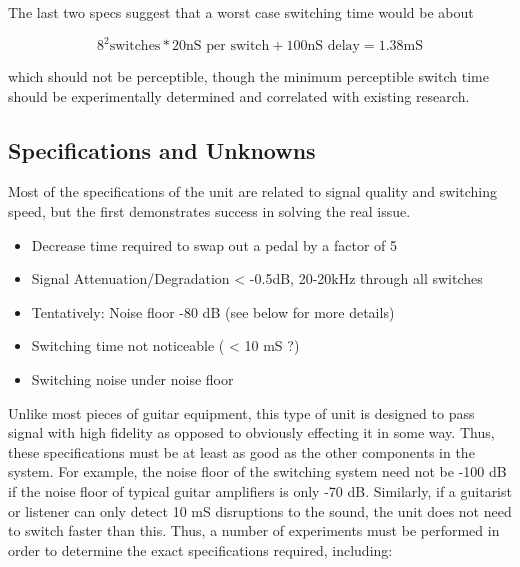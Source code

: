 \documentclass{article}
\begin{document}
The last two specs suggest that a worst case switching time would be about 

\begin{equation}
    8^2 \text{switches} * 20 \text{nS per switch} + 100 \text{nS delay} = 1.38 \text{mS}
\end{equation}

which should not be perceptible, though the minimum perceptible switch time should be experimentally determined and correlated with existing research.

\subsection{Specifications and Unknowns}

Most of the specifications of the unit are related to signal quality and switching speed, but the first demonstrates success in solving the real issue.

\begin{itemize}
    \item Decrease time required to swap out a pedal by a factor of 5
    \item Signal Attenuation/Degradation < -0.5dB, 20-20kHz through all switches
    \item Tentatively: Noise floor -80 dB (see below for more details)
    \item Switching time not noticeable ( < 10 mS ?)
    \item Switching noise under noise floor
\end{itemize}

Unlike most pieces of guitar equipment, this type of unit is designed to pass signal with high fidelity as opposed to obviously effecting it in some way.  Thus, these specifications must be at least as good as the other components in the system.  For example, the noise floor of the switching system need not be -100 dB if the noise floor of typical guitar amplifiers is only -70 dB.  Similarly, if a guitarist or listener can only detect 10 mS disruptions to the sound, the unit does not need to switch faster than this.  Thus, a number of experiments must be performed in order to determine the exact specifications required, including:
\end{document}
